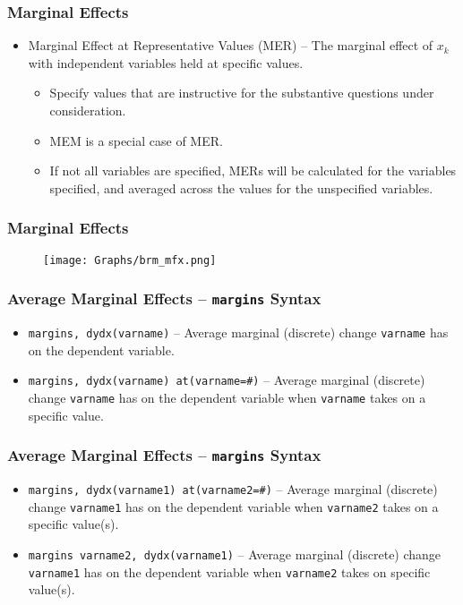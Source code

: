 \documentclass{beamer}
\begin{document}
\begin{frame}
	\frametitle{Marginal Effects}
	\begin{itemize}
		\item Marginal Effect at Representative Values (MER) -- The marginal effect of $x_{k}$ with independent variables held at specific values.
		\begin{itemize}
			\item Specify values that are instructive for the substantive questions under consideration.
			\item MEM is a special case of MER.
			\item If not all variables are specified, MERs will be calculated for the variables specified, and averaged across the values for the unspecified variables.
		\end{itemize}
	\end{itemize}
\end{frame}

\begin{frame}
	\frametitle{Marginal Effects}
	\begin{figure}[p]
		\centering
		\texttt{[image: Graphs/brm\_mfx.png]}
		\label{fig:fig2}
	\end{figure}
\end{frame}

\begin{frame}
	\frametitle{Average Marginal Effects -- \texttt{margins} Syntax}
	\begin{itemize}
		\item \texttt{margins, dydx(varname)} -- Average marginal (discrete) change \texttt{varname} has on the dependent variable.
		\item \texttt{margins, dydx(varname) at(varname=\#)} -- Average marginal (discrete) change \texttt{varname} has on the dependent variable when \texttt{varname} takes on a specific value.
	\end{itemize}
\end{frame}

\begin{frame}
	\frametitle{Average Marginal Effects -- \texttt{margins} Syntax}
	\begin{itemize}
		\item \texttt{margins, dydx(varname1) at(varname2=\#)} -- Average marginal (discrete) change \texttt{varname1} has on the dependent variable when \texttt{varname2} takes on a specific value(s).
		\item \texttt{margins varname2, dydx(varname1)} -- Average marginal (discrete) change \texttt{varname1} has on the dependent variable when \texttt{varname2} takes on specific value(s).
	\end{itemize}
\end{frame}
\end{document}
